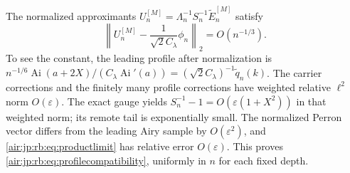 \documentclass[11pt,letterpaper]{article}
\numberwithin{equation}{section}
\theoremstyle{remark}
\newcommand{\Ai}{\operatorname{Ai}}
\newcommand{\norm}[1]{\left\lVert#1\right\rVert}
\newcommand{\eps}{\varepsilon}
\begin{document}
The normalized approximants $U_n^{[M]}=\Lambda_n^{-1}S_n^{-1}\widetilde E_n^{[M]}$ satisfy
\begin{equation}\label{air:jp:rb:eq:profilecompatibility}
 \norm{U_n^{[M]}-\frac1{\sqrt2C_\lambda}\phi_n}_2=O(n^{-1/3}).
\end{equation}
To see the constant, the leading profile after normalization is
$n^{-1/6}\Ai(a+2X)/(C_\lambda\Ai'(a))=(\sqrt2C_\lambda)^{-1}\widetilde q_n(k)$.
The carrier corrections and the finitely many profile corrections have weighted relative $\ell^2$ norm $O(\eps)$. The exact gauge yields $S_n^{-1}-1=O(\eps(1+X^2))$ in that weighted norm; its remote tail is exponentially small. The normalized Perron vector differs from the leading Airy sample by $O(\eps^2)$, and \eqref{air:jp:rb:eq:productlimit} has relative error $O(\eps)$. This proves \eqref{air:jp:rb:eq:profilecompatibility}, uniformly in $n$ for each fixed depth.
\end{document}
